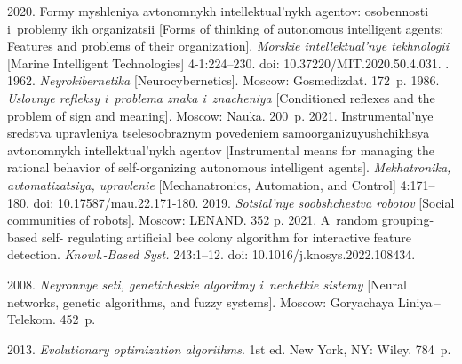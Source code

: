   \begin{multicols}{2}

\renewcommand{\bibname}{\protect\rmfamily References}

{\small\frenchspacing
 {%
 \begin{thebibliography}{9} 
 2020. For\-my mysh\-le\-niya av\-to\-nom\-nykh 
in\-tel\-lek\-tu\-al'\-nykh agen\-tov: oso\-ben\-no\-sti i~prob\-le\-my ikh or\-ga\-ni\-za\-tsii [Forms of thinking of 
autonomous intelligent agents: Features and problems of their organization]. \textit{Morskie 
intellektual'nye tekh\-no\-lo\-gii} [Marine Intelligent Technologies] 4-1:224--230. doi: 
10.37220/MIT.2020.50.4.031.
. 1962. \textit{Ney\-ro\-ki\-ber\-ne\-ti\-ka} 
[Neurocybernetics]. Moscow: Gos\-med\-iz\-dat. 172~p.
 1986. \textit{Uslov\-nye ref\-lek\-sy i~prob\-le\-ma zna\-ka i~zna\-ch\-eniya} 
[Conditioned reflexes and the problem of sign and meaning]. Moscow: Nauka. 200~p.
 2021. Ins\-tru\-men\-tal'\-nye sredst\-va up\-rav\-le\-niya 
tse\-le\-so\-ob\-raz\-nym po\-ve\-de\-ni\-em sa\-mo\-or\-ga\-ni\-zu\-yushchikhsya av\-to\-nom\-nykh in\-tel\-lek\-tu\-al'\-nykh agen\-tov 
[Instrumental means for managing the rational behavior of self-organizing autonomous intelligent 
agents]. \textit{Mekhatronika, avtomatizatsiya, upravlenie} [Mechanatronics, Automation, and Control] 4:171--180. doi: 
10.17587/mau.22.171-180.
 2019. \textit{So\-tsi\-al'\-nye so\-ob\-shchest\-va 
ro\-bo\-tov} [Social communities of robots]. Moscow: LENAND. 352 p.
 2021. A~random grouping-based self-
regulating artificial bee colony algorithm for interactive feature detection. \textit{Knowl.-Based 
Syst.} 243:1--12. doi: 10.1016/j.knosys.2022.108434.
  
 2008. \textit{Ney\-ron\-nye se\-ti, 
ge\-ne\-ti\-che\-skie al\-go\-rit\-my i~ne\-chet\-kie sis\-te\-my} [Neural networks, genetic algorithms, and fuzzy 
systems]. Moscow: Goryachaya Liniya\,--\,Telekom. 452~p.

 2013. \textit{Evolutionary optimization algorithms}. 1st ed. New York, NY: 
Wiley. 784~p.

\end{thebibliography}

 }
 }

\end{multicols}

